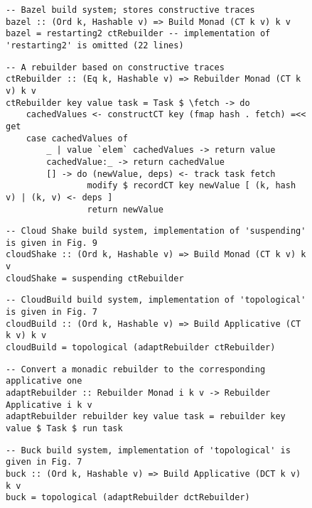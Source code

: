 \begin{figure}
\begin{verbatim}
-- Bazel build system; stores constructive traces
bazel :: (Ord k, Hashable v) => Build Monad (CT k v) k v
bazel = restarting2 ctRebuilder -- implementation of 'restarting2' is omitted (22 lines)
\end{verbatim}
\vspace{0mm}
\begin{verbatim}
-- A rebuilder based on constructive traces
ctRebuilder :: (Eq k, Hashable v) => Rebuilder Monad (CT k v) k v
ctRebuilder key value task = Task $ \fetch -> do
    cachedValues <- constructCT key (fmap hash . fetch) =<< get
    case cachedValues of
        _ | value `elem` cachedValues -> return value
        cachedValue:_ -> return cachedValue
        [] -> do (newValue, deps) <- track task fetch
                modify $ recordCT key newValue [ (k, hash v) | (k, v) <- deps ]
                return newValue
\end{verbatim}
\vspace{0mm}
\begin{verbatim}
-- Cloud Shake build system, implementation of 'suspending' is given in Fig. 9
cloudShake :: (Ord k, Hashable v) => Build Monad (CT k v) k v
cloudShake = suspending ctRebuilder
\end{verbatim}
\vspace{0mm}
\begin{verbatim}
-- CloudBuild build system, implementation of 'topological' is given in Fig. 7
cloudBuild :: (Ord k, Hashable v) => Build Applicative (CT k v) k v
cloudBuild = topological (adaptRebuilder ctRebuilder)
\end{verbatim}
\vspace{0mm}
\begin{verbatim}
-- Convert a monadic rebuilder to the corresponding applicative one
adaptRebuilder :: Rebuilder Monad i k v -> Rebuilder Applicative i k v
adaptRebuilder rebuilder key value task = rebuilder key value $ Task $ run task
\end{verbatim}
\vspace{0mm}
\begin{verbatim}
-- Buck build system, implementation of 'topological' is given in Fig. 7
buck :: (Ord k, Hashable v) => Build Applicative (DCT k v) k v
buck = topological (adaptRebuilder dctRebuilder)
\end{verbatim}

\end{figure}
